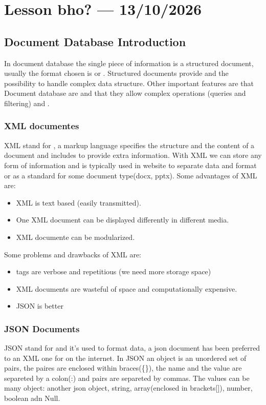 \section{Lesson bho? --- 13/10/2026}

\subsection{Document Database Introduction}
In document database the single piece of information is a structured document, usually the format chosen is  or . Structured documents provide  and the possibility to handle complex data structure. Other important features are that Document database are  and that they allow complex operations (queries and filtering) and .

\subsubsection{XML documentes}
XML stand for , a markup language specifies the structure and the content of a document and includes  to provide extra information. With XML we can store any form of information and is typically used in website to separate data and format or as a standard for some document type(docx, pptx). Some advantages of XML are:
\begin{itemize}
    \item XML is text based (easily transmitted).
    \item One XML document can be displayed differently in different media.
    \item XML documente can be modularized.
\end{itemize}

Some problems and drawbacks of XML are:
\begin{itemize}
    \item tags are verbose and repetitious (we need more storage space)
    \item XML documents are wasteful of space and computationally expensive.
    \item JSON is better
\end{itemize}

\subsubsection{JSON Documents}
JSON stand for  and it's used to format data, a json document has been preferred to an XML one for  on the internet. In JSON an object is an unordered set of  pairs, the paires are enclosed within braces(\{\}), the name and the value are separeted by a colon(:) and pairs are separeted by commas. The values can be many object: another json object, string, array(enclosed in brackets[]), number, boolean adn Null.

